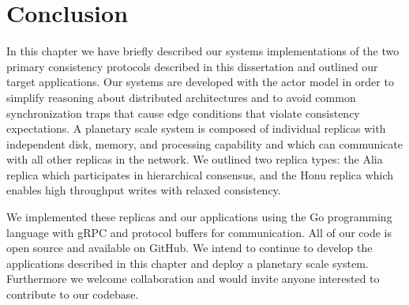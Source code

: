 \section{Conclusion}
\label{ch05_conclusion}

In this chapter we have briefly described our systems implementations of the two primary consistency protocols described in this dissertation and outlined our target applications.
Our systems are developed with the actor model in order to simplify reasoning about distributed architectures and to avoid common synchronization traps that cause edge conditions that violate consistency expectations.
A planetary scale system is composed of individual replicas with independent disk, memory, and processing capability and which can communicate with all other replicas in the network.
We outlined two replica types: the Alia replica which participates in hierarchical consensus, and the Honu replica which enables high throughput writes with relaxed consistency.

We implemented these replicas and our applications using the Go programming language with gRPC and protocol buffers for communication.
All of our code is open source and available on GitHub.
We intend to continue to develop the applications described in this chapter and deploy a planetary scale system.
Furthermore we welcome collaboration and would invite anyone interested to contribute to our codebase.

